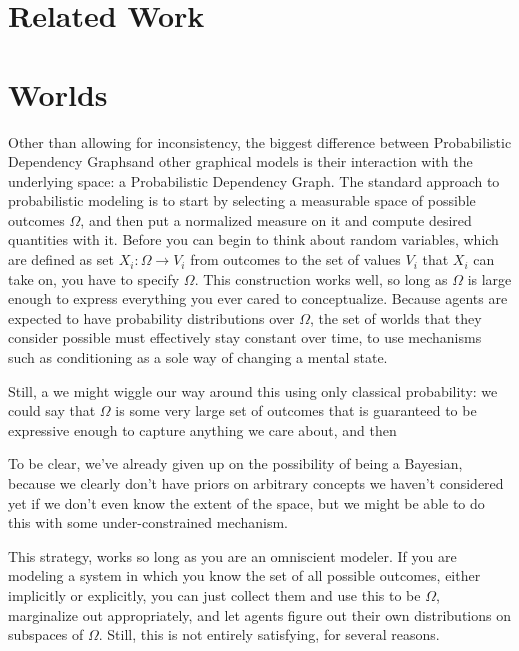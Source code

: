 \documentclass{article}
\newcommand{\modelname}{Probabilistic Dependency Graph}
\newcommand{\modelnames}{Probabilistic Dependency Graphs}
\begin{document}
	
	\section{Related Work}
	
	\section{Worlds}
	Other than allowing for inconsistency, the biggest difference between \modelnames and other graphical models is their interaction with the underlying space: a \modelname . The standard approach to probabilistic modeling is to start by selecting a measurable space of possible outcomes $\Omega$, and then put a normalized measure on it and compute desired quantities with it. Before you can begin to think about random variables, which are defined as set $X_i : \Omega \to V_i$ from outcomes to the set of values $V_i$ that $X_i$ can take on, you have to specify $\Omega$. This construction works well, so long as $\Omega$ is large enough to express everything you ever cared to conceptualize. Because agents are expected to have probability distributions over $\Omega$, the set of worlds that they consider possible must effectively stay constant over time, to use mechanisms such as conditioning as a sole way of changing a mental state. 
	
	Still, a we might wiggle our way around this using only classical probability: we could say that $\Omega$ is some very large set of outcomes that is guaranteed to be expressive enough to capture anything we care about, and then 
	
	To be clear, we've already given up on the possibility of being a Bayesian, because we clearly don't have priors on arbitrary concepts we haven't considered yet if we don't even know the extent of the space, but we might be able to do this with some under-constrained mechanism. 
	
	This strategy, works so long as you are an omniscient modeler. If you are modeling a system in which you know the set of all possible outcomes, either implicitly or explicitly, you can just collect them and use this to be $\Omega$, marginalize out appropriately, and let agents figure out their own distributions on subspaces of $\Omega$. Still, this is not entirely satisfying, for several reasons. 
	
\end{document}
